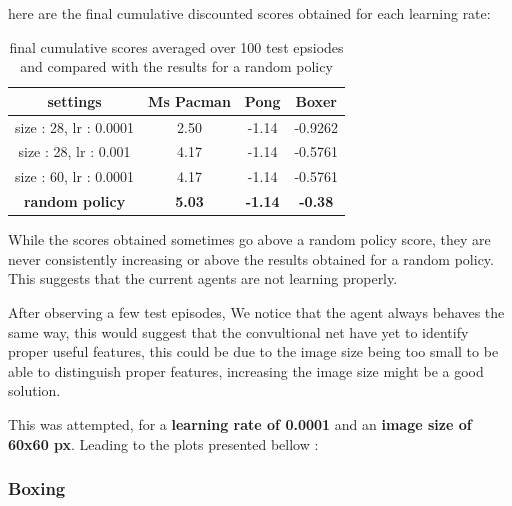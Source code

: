 \documentclass{report}
\begin{document}
here are the final cumulative discounted scores obtained for each learning rate: \\

\begin{table}[H]
\centering
\label{b4Tab}
\begin{tabular}{|c|c|c|c|}
\hline
settings & Ms Pacman & Pong & Boxer \\ \hline
size : 28, lr : 0.0001  & 2.50 & -1.14 & -0.9262 \\ \hline
size : 28, lr : 0.001  & 4.17 & -1.14 & -0.5761 \\ \hline
size : 60, lr : 0.0001  & 4.17 & -1.14 & -0.5761 \\ \hline
\textbf{random policy} & \textbf{5.03} & \textbf{-1.14} & \textbf{-0.38}  \\ \hline
\end{tabular}


\caption{final cumulative scores averaged over 100 test epsiodes and compared with the results for a random policy }
\end{table}

While the scores obtained sometimes go above a random policy score, they are never consistently increasing or above the results obtained for a random policy. This suggests that the current agents are not learning properly. 

After observing a few test episodes, We notice that the agent always behaves the same way, this would suggest that the convultional net have yet to identify proper useful features, this could be due to the image size being too small to be able to distinguish proper features, increasing the image size might be a good solution. 

This was attempted, for a \textbf{learning rate of 0.0001} and an \textbf{image size of 60x60 px}. Leading to the plots presented bellow : 


\subsubsection*{Boxing}
\end{document}
